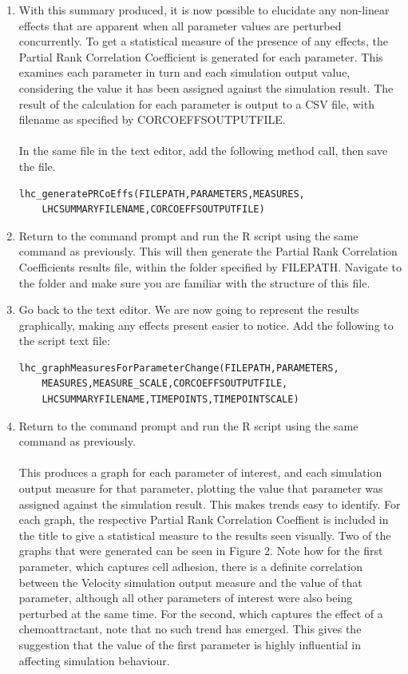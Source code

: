 \documentclass[a4paper,11pt]{article}
\begin{document}
\begin{enumerate}
\item With this summary produced, it is now possible to elucidate any non-linear effects that are apparent when all parameter values are perturbed concurrently. To get a statistical measure of the presence of any effects, the Partial Rank Correlation Coefficient is generated for each parameter. This examines each parameter in turn and each simulation output value, considering the value it has been assigned against the simulation result.  The result of the calculation for each parameter is output to a CSV file, with filename as specified by CORCOEFFSOUTPUTFILE.\\
\\
In the same file in the text editor, add the following method call, then save the file.

\begin{verbatim}
lhc_generatePRCoEffs(FILEPATH,PARAMETERS,MEASURES,
	LHCSUMMARYFILENAME,CORCOEFFSOUTPUTFILE)
\end{verbatim}

\item Return to the command prompt and run the R script using the same command as previously. This will then generate the Partial Rank Correlation Coefficients results file, within the folder specified by FILEPATH. Navigate to the folder and make sure you are familiar with the structure of this file.

\item Go back to the text editor. We are now going to represent the results graphically, making any effects present easier to notice. Add the following to the script text file:

\begin{verbatim}
lhc_graphMeasuresForParameterChange(FILEPATH,PARAMETERS,
	MEASURES,MEASURE_SCALE,CORCOEFFSOUTPUTFILE,
	LHCSUMMARYFILENAME,TIMEPOINTS,TIMEPOINTSCALE)
\end{verbatim}

\item Return to the command prompt and run the R script using the same command as previously.\\
\\
This produces a graph for each parameter of interest, and each simulation output measure for that parameter, plotting the value that parameter was assigned against the simulation result. This makes trends easy to identify. For each graph, the respective Partial Rank Correlation Coeffient is included in the title to give a statistical measure to the results seen visually. Two of the graphs that were generated can be seen in Figure 2. Note how for the first parameter, which captures cell adhesion, there is a definite correlation between the Velocity simulation output measure and the value of that parameter, although all other parameters of interest were also being perturbed at the same time.  For the second, which captures the effect of a chemoattractant, note that no such trend has emerged. This gives the suggestion that the value of the first parameter is highly influential in affecting simulation behaviour.\\
\\

\end{enumerate}
\end{document}

